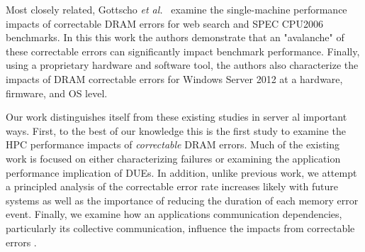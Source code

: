 Most closely related, Gottscho {\it et al.}~\cite{Gottscho:2017:Measuring}
examine the single-machine performance impacts of correctable DRAM errors for
web search and SPEC CPU2006 benchmarks.  In this this work the authors
demonstrate that an "avalanche" of these correctable errors can significantly
impact benchmark performance.  Finally, using a proprietary hardware and
software tool, the authors also characterize the impacts of DRAM correctable
errors for Windows Server 2012 at a hardware, firmware, and OS level.



Our work distinguishes itself from these existing studies in server al important
ways.  First, to the best of our knowledge this is the first study to examine
the HPC performance impacts of \emph{correctable} DRAM errors.  Much of the existing
work is focused on either characterizing failures or examining the application
performance implication of DUEs. In addition, unlike previous work, we attempt a
principled analysis of the correctable error rate increases likely with future
systems as well as the importance of reducing the duration of each memory error
event.  Finally, we examine how an applications communication dependencies,
particularly its collective communication, influence the impacts from correctable
errors .

